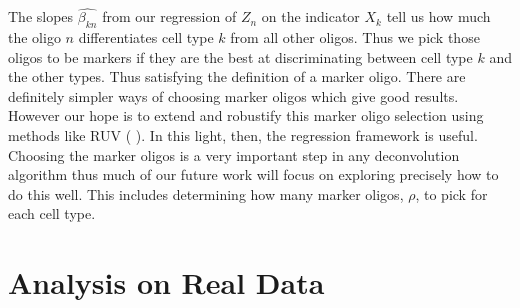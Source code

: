 \documentclass[reqno,12pt,oneside]{report}\usepackage[]{graphicx}\usepackage[]{color}
\renewcommand{\citet}[1]{(\citeauthor{#1} \citeyear{#1})}
\theoremstyle{plain}
\theoremstyle{definition}
\theoremstyle{remark}
\numberwithin{theorem}{chapter}     %
\begin{document}
The slopes $\widehat{\beta_{kn}}$ from our regression of $Z_n$ on the indicator $X_k$ tell us how much the oligo $n$ differentiates cell type $k$ from all other oligos. Thus we pick those oligos to be markers if they are the best at discriminating between cell type $k$ and the other types. Thus satisfying the definition of a marker oligo. There are definitely simpler ways of choosing marker oligos which give good results. However our hope is to extend and robustify this marker oligo selection using methods like RUV \citet{Gagnon-Bartsch2012}. In this light, then, the regression framework is useful. Choosing the marker oligos is a very important step in any deconvolution algorithm thus much of our future work will focus on exploring precisely how to do this well. This includes determining how many marker oligos, $\rho$, to pick for each cell type. 

 \chapter{Analysis on Real Data}
 \label{chap:Analysis}
\end{document}
